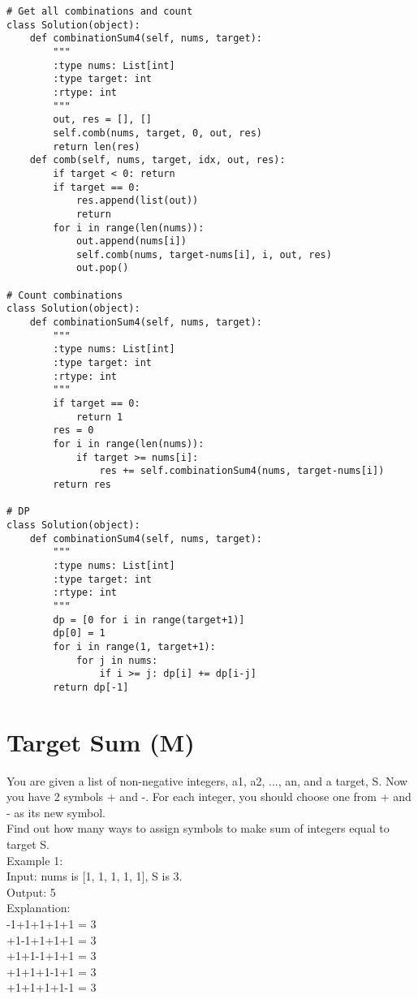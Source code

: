 \begin{lstlisting}
# Get all combinations and count
class Solution(object):
    def combinationSum4(self, nums, target):
        """
        :type nums: List[int]
        :type target: int
        :rtype: int
        """
        out, res = [], []
        self.comb(nums, target, 0, out, res)
        return len(res)
    def comb(self, nums, target, idx, out, res):
        if target < 0: return
        if target == 0:
            res.append(list(out))
            return
        for i in range(len(nums)):
            out.append(nums[i])
            self.comb(nums, target-nums[i], i, out, res)
            out.pop()

# Count combinations
class Solution(object):
    def combinationSum4(self, nums, target):
        """
        :type nums: List[int]
        :type target: int
        :rtype: int
        """
        if target == 0:
            return 1
        res = 0
        for i in range(len(nums)):
            if target >= nums[i]:
                res += self.combinationSum4(nums, target-nums[i])
        return res
    
# DP
class Solution(object):
    def combinationSum4(self, nums, target):
        """
        :type nums: List[int]
        :type target: int
        :rtype: int
        """
        dp = [0 for i in range(target+1)]
        dp[0] = 1
        for i in range(1, target+1):
            for j in nums:
                if i >= j: dp[i] += dp[i-j]
        return dp[-1]
\end{lstlisting}

\section{Target Sum (M)}
 You are given a list of non-negative integers, a1, a2, ..., an, and a target, S. Now you have 2 symbols + and -. For each integer, you should choose one from + and - as its new symbol.\\

Find out how many ways to assign symbols to make sum of integers equal to target S.\\

Example 1:\\

Input: nums is [1, 1, 1, 1, 1], S is 3. \\
Output: 5\\
Explanation: \\

-1+1+1+1+1 = 3\\
+1-1+1+1+1 = 3\\
+1+1-1+1+1 = 3\\
+1+1+1-1+1 = 3\\
+1+1+1+1-1 = 3\\

